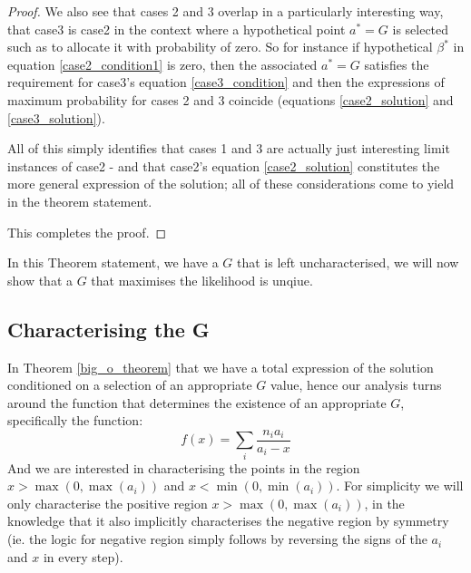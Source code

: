 \documentclass[12pt]{colt2020} %
\begin{document}
\begin{proof}
We also see that cases 2 and 3 overlap in a particularly interesting way, that case3 is case2 in the context where a hypothetical point $a^*=G$ is selected such as to allocate it with probability of zero. So for instance if hypothetical $\beta^*$ in equation \eqref{case2_condition1} is zero, then the associated $a^*=G$ satisfies the requirement for case3's equation \ref{case3_condition} and then the expressions of maximum probability for cases 2 and 3 coincide (equations \ref{case2_solution} and \ref{case3_solution}).

All of this simply identifies that cases 1 and 3 are actually just interesting limit instances of case2 - and that case2's equation \ref{case2_solution} constitutes the more general expression of the solution; all of these considerations come to yield in the theorem statement.

This completes the proof.
\end{proof}

\noindent In this Theorem statement, we have a $G$ that is left uncharacterised, we will now show that a $G$ that maximises the likelihood is unqiue.

\subsection{Characterising the G}

In Theorem \ref{big_o_theorem} that we have a total expression of the solution conditioned on a selection of an appropriate $G$ value, hence our analysis turns around the function that determines the existence of an appropriate $G$, specifically the function:
\begin{equation}\label{funcfunc}f(x) = \sum_i\frac{n_ia_i}{a_i-x}\end{equation}
And we are interested in characterising the points in the region $x>\max(0,\max(a_i))$ and $x<\min(0,\min(a_i))$. For simplicity we will only characterise the positive region $x>\max(0,\max(a_i))$, in the knowledge that it also implicitly characterises the negative region by symmetry (ie. the logic for negative region simply follows by reversing the signs of the $a_i$ and $x$ in every step).
\end{document}
